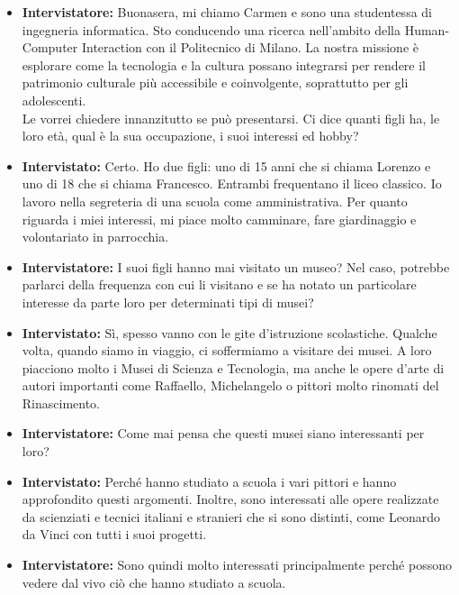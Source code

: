 \documentclass{article}
\begin{document}
\begin{itemize}
    \item \textbf{Intervistatore:} Buonasera, mi chiamo Carmen e sono una studentessa di ingegneria informatica. Sto conducendo una ricerca nell’ambito della Human-Computer Interaction con il Politecnico di Milano. La nostra missione è esplorare come la tecnologia e la cultura possano integrarsi per rendere il patrimonio culturale più accessibile e coinvolgente, soprattutto per gli adolescenti.\\
    
    Le vorrei chiedere innanzitutto se può presentarsi. Ci dice quanti figli ha, le loro età, qual è la sua occupazione, i suoi interessi ed hobby?
    
    \item \textbf{Intervistato:} Certo. Ho due figli: uno di 15 anni che si chiama Lorenzo e uno di 18 che si chiama Francesco. Entrambi frequentano il liceo classico. Io lavoro nella segreteria di una scuola come amministrativa. Per quanto riguarda i miei interessi, mi piace molto camminare, fare giardinaggio e volontariato in parrocchia.
    
    \item \textbf{Intervistatore:} I suoi figli hanno mai visitato un museo? Nel caso, potrebbe parlarci della frequenza con cui li visitano e se ha notato un particolare interesse da parte loro per determinati tipi di musei?
    
    \item \textbf{Intervistato:} Sì, spesso vanno con le gite d’istruzione scolastiche. Qualche volta, quando siamo in viaggio, ci soffermiamo a visitare dei musei. A loro piacciono molto i Musei di Scienza e Tecnologia, ma anche le opere d’arte di autori importanti come Raffaello, Michelangelo o pittori molto rinomati del Rinascimento.
    
    \item \textbf{Intervistatore:} Come mai pensa che questi musei siano interessanti per loro?
    
    \item \textbf{Intervistato:} Perché hanno studiato a scuola i vari pittori e hanno approfondito questi argomenti. Inoltre, sono interessati alle opere realizzate da scienziati e tecnici italiani e stranieri che si sono distinti, come Leonardo da Vinci con tutti i suoi progetti.
    
    \item \textbf{Intervistatore:} Sono quindi molto interessati principalmente perché possono vedere dal vivo ciò che hanno studiato a scuola.
    

\end{itemize}
\end{document}
